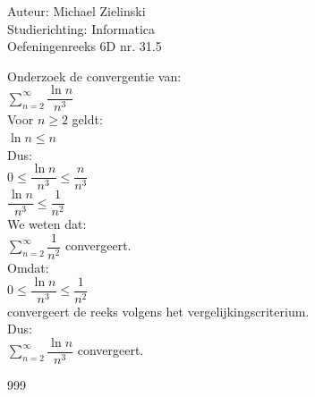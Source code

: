 \documentclass[a4paper]{article}
\begin{document}
\noindent \large Auteur: Michael Zielinski \\
\noindent \large Studierichting: Informatica \\
\noindent \large Oefeningenreeks 6D nr. 31.5 \\

\medskip

\normalsize

Onderzoek de convergentie van: \\

$ \displaystyle\sum_{n=2}^{\infty} \dfrac{\ln n}{n^3} $ \\

Voor $n \geq 2$ geldt: \\

$ \ln n \leq n $ \\

Dus: \\

$ 0 \leq \dfrac{\ln n}{n^3} \leq \dfrac{n}{n^3} $ \\

$ \dfrac{\ln n}{n^3} \leq \dfrac{1}{n^2} $ \\

We weten dat: \\

$ \displaystyle\sum_{n=2}^{\infty} \dfrac{1}{n^2} $ convergeert. \\

Omdat: \\

$ 0 \leq \dfrac{\ln n}{n^3} \leq \dfrac{1}{n^2} $ \\

convergeert de reeks volgens het vergelijkingscriterium. \\

Dus: \\

$ \displaystyle\sum_{n=2}^{\infty} \dfrac{\ln n}{n^3} $ convergeert. \\

\begin{thebibliography}{999}
\end{thebibliography}
\end{document}
